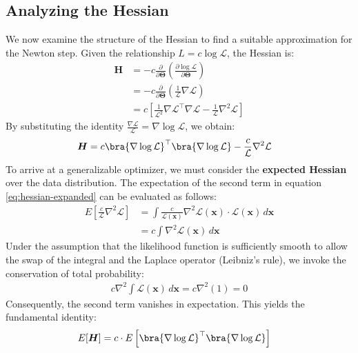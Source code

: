 \subsection{Analyzing the Hessian}
We now examine the structure of the Hessian to find a suitable approximation for the Newton step. Given the relationship $L = c \log \mathcal{L}$, the Hessian is:
\begin{align}
	\label{eq:hessian-derivation}
	\boldsymbol{H} &= -c \frac{\partial}{\partial \boldsymbol{\Theta}} \left( \frac{\partial \log \mathcal{L}}{\partial \boldsymbol{\Theta}} \right) \\
	&= -c \frac{\partial}{\partial \boldsymbol{\Theta}} \left( \frac{1}{\mathcal{L}} \nabla \mathcal{L} \right) \\
	&= c \left[ \frac{1}{\mathcal{L}^2} \nabla \mathcal{L}^\top \nabla \mathcal{L} - \frac{1}{\mathcal{L}} \nabla^2 \mathcal{L} \right]
\end{align}
By substituting the identity $\frac{\nabla \mathcal{L}}{\mathcal{L}} = \nabla \log \mathcal{L}$, we obtain:
\begin{align}
	\label{eq:hessian-expanded}
	\boldsymbol{H} &= c \bra{\nabla \log \mathcal{L}}^\top \bra{\nabla \log \mathcal{L}} - \frac{c}{\mathcal{L}} \nabla^2 \mathcal{L}
\end{align}
To arrive at a generalizable optimizer, we must consider the \textbf{expected Hessian} over the data distribution. The expectation of the second term in equation \eqref{eq:hessian-expanded} can be evaluated as follows:
\begin{align}
	E\left[ \frac{c}{\mathcal{L}} \nabla^2 \mathcal{L} \right] &= \int \frac{c}{\mathcal{L}(\boldsymbol{x})} \nabla^2 \mathcal{L}(\boldsymbol{x}) \cdot \mathcal{L}(\boldsymbol{x}) \, d\boldsymbol{x} \\
	&= c \int \nabla^2 \mathcal{L}(\boldsymbol{x}) \, d\boldsymbol{x}
\end{align}
Under the assumption that the likelihood function is sufficiently smooth to allow the swap of the integral and the Laplace operator (Leibniz's rule), we invoke the conservation of total probability:
\begin{align}
	c \nabla^2 \int \mathcal{L}(\boldsymbol{x}) \, d\boldsymbol{x} = c \nabla^2 (1) = 0
\end{align}
Consequently, the second term vanishes in expectation. This yields the fundamental identity:
\begin{align}
	\label{eq:fisher-identity}
	E[\boldsymbol{H}] &= c \cdot E\left[ \bra{\nabla \log \mathcal{L}}^\top \bra{\nabla \log \mathcal{L}} \right]
\end{align}
